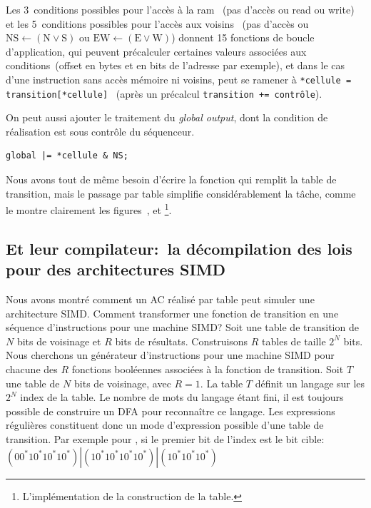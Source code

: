 Les 3~conditions possibles pour l'accès à la ram~%
(pas d'accès ou read ou write) %
et les 5~conditions possibles pour l'accès aux voisins~%
(pas d'accès ou $\text{NS} \leftarrow (\text{N} \vee \text{S})$ %
ou $\text{EW} \leftarrow (\text{E} \vee \text{W})$) %
donnent 15 fonctions de boucle d'application, qui peuvent précalculer
certaines valeurs associées aux conditions~(offset en bytes et en bits
de l'adresse par exemple), et dans le cas d'une instruction sans accès
mémoire ni voisins, peut se ramener à %
\texttt{*cellule = transition[*cellule]}~%
(après un précalcul \texttt{transition += contrôle}). %

On peut aussi ajouter le traitement du \emph{global output},
dont la condition de réalisation est sous contrôle du séquenceur. %

\begin{verbatim}
global |= *cellule & NS;
\end{verbatim}

Nous avons tout de même besoin d'écrire la fonction qui remplit la
table de transition, mais le passage par table simplifie
considérablement la tâche, comme le montre clairement les
figures~, %
 et %
\footnote{%
  L'implémentation de la construction de la table.
}. %

\subsection{Et leur compilateur:~la décompilation des lois pour des
  architectures SIMD}

Nous avons montré comment un AC réalisé par table
peut simuler une architecture SIMD\@. %
Comment transformer une fonction de transition en une séquence
d'instructions pour une machine SIMD\@? %
Soit une table de transition de $N$ bits de voisinage
et $R$ bits de résultats. %
Construisons $R$ tables de taille $2^{N}$ bits. %
Nous cherchons un générateur d'instructions pour une machine SIMD pour
chacune des $R$ fonctions booléennes associées à la fonction de
transition. %
Soit $T$ une table de $N$ bits de voisinage,
avec $R = 1$. %
La table $T$ définit un langage sur les $2^{N}$ index de la table. %
Le nombre de mots du langage étant fini, il est toujours possible de
construire un DFA pour reconnaître ce langage. %
Les expressions régulières constituent donc un mode d'expression
possible d'une table de transition. %
Par exemple pour , si le premier bit de l'index est le bit cible:\\
$(00^*10^*10^*10^*)|(10^*10^*10^*10^*)|(10^*10^*10^*)$

